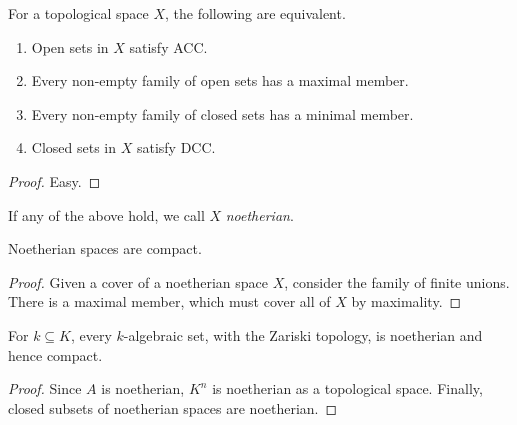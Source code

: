  \begin{proposition}
   For a topological space $X$, the following are equivalent.
   \begin{enumerate}
     \item Open sets in $X$ satisfy ACC.
     \item Every non-empty family of open sets has a maximal member.
     \item Every non-empty family of closed sets has a minimal member.
     \item Closed sets in $X$ satisfy DCC.
   \end{enumerate}
 \end{proposition}
 \begin{proof}
   Easy.
 \end{proof}
 \begin{definition}
   If any of the above hold, we call $X$ \emph{noetherian}.
 \end{definition}
 \begin{proposition}
   Noetherian spaces are compact.
 \end{proposition}
 \begin{proof}
   Given a cover of a noetherian space $X$, consider the family of finite unions. There
   is a maximal member, which must cover all of $X$ by maximality.
 \end{proof}
 \begin{corollary}
   For $k\subseteq K$, every $k$-algebraic set, with the Zariski topology, is noetherian
   and hence compact.
 \end{corollary}
 \begin{proof}
   Since $A$ is noetherian, $K^n$ is noetherian as a topological space. Finally, closed
   subsets of noetherian  spaces are noetherian.
 \end{proof}
